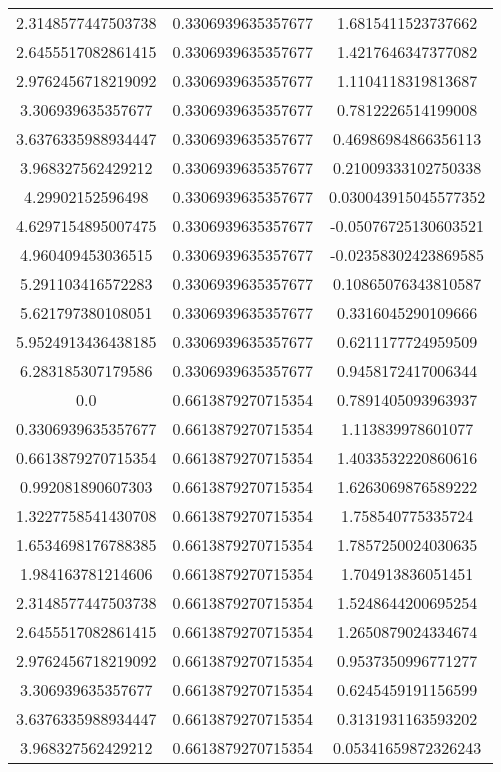 \begin{table}
\begin{tabular}{ccc}
2.3148577447503738 & 0.3306939635357677 & 1.6815411523737662 \\
2.6455517082861415 & 0.3306939635357677 & 1.4217646347377082 \\
2.9762456718219092 & 0.3306939635357677 & 1.1104118319813687 \\
3.306939635357677 & 0.3306939635357677 & 0.7812226514199008 \\
3.6376335988934447 & 0.3306939635357677 & 0.46986984866356113 \\
3.968327562429212 & 0.3306939635357677 & 0.21009333102750338 \\
4.29902152596498 & 0.3306939635357677 & 0.030043915045577352 \\
4.6297154895007475 & 0.3306939635357677 & -0.05076725130603521 \\
4.960409453036515 & 0.3306939635357677 & -0.02358302423869585 \\
5.291103416572283 & 0.3306939635357677 & 0.10865076343810587 \\
5.621797380108051 & 0.3306939635357677 & 0.3316045290109666 \\
5.9524913436438185 & 0.3306939635357677 & 0.6211177724959509 \\
6.283185307179586 & 0.3306939635357677 & 0.9458172417006344 \\
0.0 & 0.6613879270715354 & 0.7891405093963937 \\
0.3306939635357677 & 0.6613879270715354 & 1.113839978601077 \\
0.6613879270715354 & 0.6613879270715354 & 1.4033532220860616 \\
0.992081890607303 & 0.6613879270715354 & 1.6263069876589222 \\
1.3227758541430708 & 0.6613879270715354 & 1.758540775335724 \\
1.6534698176788385 & 0.6613879270715354 & 1.7857250024030635 \\
1.984163781214606 & 0.6613879270715354 & 1.704913836051451 \\
2.3148577447503738 & 0.6613879270715354 & 1.5248644200695254 \\
2.6455517082861415 & 0.6613879270715354 & 1.2650879024334674 \\
2.9762456718219092 & 0.6613879270715354 & 0.9537350996771277 \\
3.306939635357677 & 0.6613879270715354 & 0.6245459191156599 \\
3.6376335988934447 & 0.6613879270715354 & 0.3131931163593202 \\
3.968327562429212 & 0.6613879270715354 & 0.05341659872326243 \\

\end{tabular}
\end{table}
